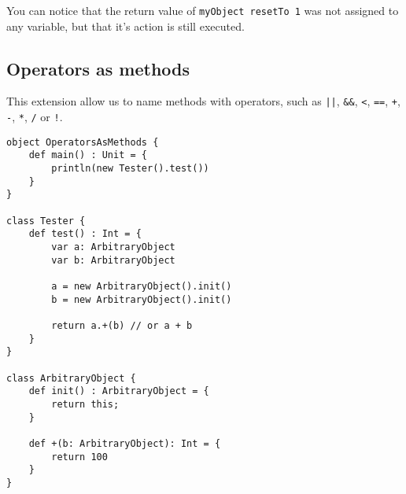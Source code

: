You can notice that the return value of \lstinline$myObject resetTo 1$ was not assigned to any variable, but that it's action is still executed.

\subsection{Operators as methods}

This extension allow us to name methods with operators, such as \lstinline$||$, \lstinline$&&$, \lstinline$<$, \lstinline$==$, \lstinline$+$, \lstinline$-$, \lstinline$*$, \lstinline$/$ or \lstinline$!$.

\begin{lstlisting}
object OperatorsAsMethods {
    def main() : Unit = {
        println(new Tester().test())
    }
}

class Tester {
    def test() : Int = {
		var a: ArbitraryObject
		var b: ArbitraryObject

		a = new ArbitraryObject().init()
		b = new ArbitraryObject().init()

		return a.+(b) // or a + b
    }
}

class ArbitraryObject {
	def init() : ArbitraryObject = {
		return this;
	}

	def +(b: ArbitraryObject): Int = {
		return 100
	}
}
\end{lstlisting}
